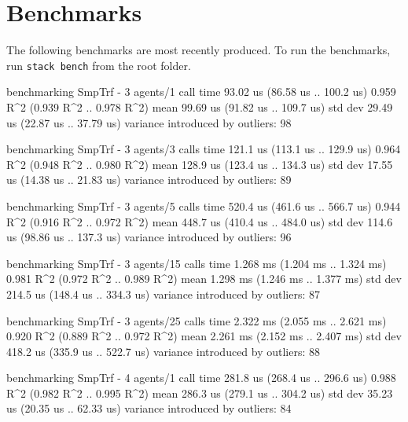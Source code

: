 \section{Benchmarks}\label{app:Benchmarks}

The following benchmarks are most recently produced.
To run the benchmarks, run \texttt{stack bench} from the root folder.

\begin{showCode}
    benchmarking SmpTrf - 3 agents/1 call
    time                 93.02 us   (86.58 us .. 100.2 us)
                         0.959 R^2   (0.939 R^2 .. 0.978 R^2)
    mean                 99.69 us   (91.82 us .. 109.7 us)
    std dev              29.49 us   (22.87 us .. 37.79 us)
    variance introduced by outliers: 98%

    benchmarking SmpTrf - 3 agents/3 calls
    time                 121.1 us   (113.1 us .. 129.9 us)
                         0.964 R^2   (0.948 R^2 .. 0.980 R^2)
    mean                 128.9 us   (123.4 us .. 134.3 us)
    std dev              17.55 us   (14.38 us .. 21.83 us)
    variance introduced by outliers: 89%

    benchmarking SmpTrf - 3 agents/5 calls
    time                 520.4 us   (461.6 us .. 566.7 us)
                         0.944 R^2   (0.916 R^2 .. 0.972 R^2)
    mean                 448.7 us   (410.4 us .. 484.0 us)
    std dev              114.6 us   (98.86 us .. 137.3 us)
    variance introduced by outliers: 96%

    benchmarking SmpTrf - 3 agents/15 calls
    time                 1.268 ms   (1.204 ms .. 1.324 ms)
                         0.981 R^2   (0.972 R^2 .. 0.989 R^2)
    mean                 1.298 ms   (1.246 ms .. 1.377 ms)
    std dev              214.5 us   (148.4 us .. 334.3 us)
    variance introduced by outliers: 87%

    benchmarking SmpTrf - 3 agents/25 calls
    time                 2.322 ms   (2.055 ms .. 2.621 ms)
                         0.920 R^2   (0.889 R^2 .. 0.972 R^2)
    mean                 2.261 ms   (2.152 ms .. 2.407 ms)
    std dev              418.2 us   (335.9 us .. 522.7 us)
    variance introduced by outliers: 88%

    benchmarking SmpTrf - 4 agents/1 call
    time                 281.8 us   (268.4 us .. 296.6 us)
                         0.988 R^2   (0.982 R^2 .. 0.995 R^2)
    mean                 286.3 us   (279.1 us .. 304.2 us)
    std dev              35.23 us   (20.35 us .. 62.33 us)
    variance introduced by outliers: 84%


\end{showCode}
